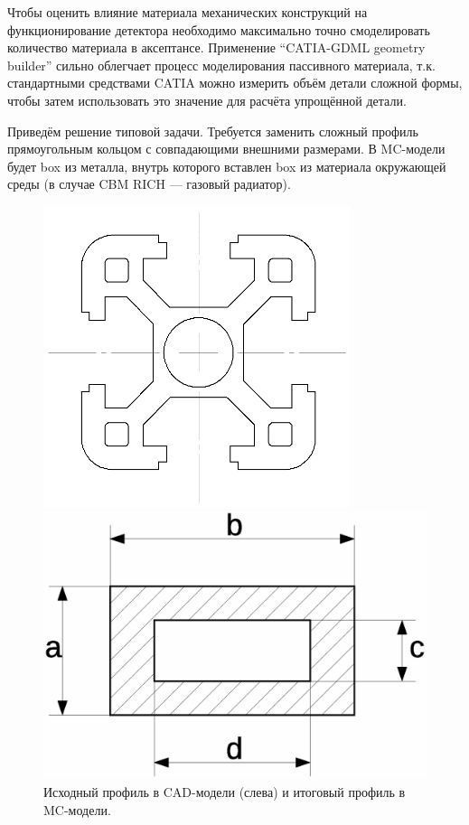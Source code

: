 Чтобы оценить влияние материала механических конструкций на функционирование детектора необходимо максимально точно смоделировать количество материала в аксептансе. Применение ``CATIA-GDML geometry builder'' сильно облегчает процесс моделирования пассивного материала, т.к. стандартными средствами CATIA можно измерить объём детали сложной формы, чтобы затем использовать это значение для расчёта упрощённой детали.

Приведём решение типовой задачи. Требуется заменить сложный профиль прямоугольным кольцом с совпадающими внешними размерами. В MC-модели будет box из металла, внутрь которого вставлен box из материала окружающей среды (в случае CBM RICH --- газовый радиатор).

\begin{figure}[H]
\begin{minipage}[b]{0.495\textwidth}
\includegraphics[width=0.8\textwidth]{pictures/Complex_profile.png}
\end{minipage}
\hspace{0.01\textwidth}
\begin{minipage}[b]{0.495\textwidth}
\includegraphics[width=1.0\textwidth]{pictures/Material_budget.eps}
\end{minipage}
\caption{Исходный профиль в CAD-модели (слева) и итоговый профиль в MC-модели.}
\label{fig:geoProfiles}
\end{figure}

